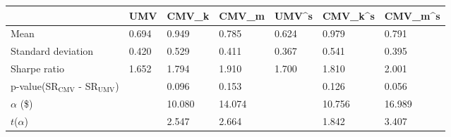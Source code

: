 \begin{tabular}{lllllll}
\toprule
 & UMV & CMV_k & CMV_m & UMV^s & CMV_k^s & CMV_m^s \\
\midrule
Mean & 0.694 & 0.949 & 0.785 & 0.624 & 0.979 & 0.791 \\
Standard deviation & 0.420 & 0.529 & 0.411 & 0.367 & 0.541 & 0.395 \\
Sharpe ratio & 1.652 & 1.794 & 1.910 & 1.700 & 1.810 & 2.001 \\
p-value(SR$_{\text{CMV}}$ - SR$_{\text{UMV}}$) &  & 0.096 & 0.153 &  & 0.126 & 0.056 \\
$\alpha$ (\$) &  & 10.080 & 14.074 &  & 10.756 & 16.989 \\
$t$($\alpha$) &  & 2.547 & 2.664 &  & 1.842 & 3.407 \\
\bottomrule
\end{tabular}

